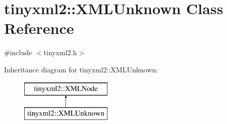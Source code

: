 \hypertarget{classtinyxml2_1_1_x_m_l_unknown}{\section{tinyxml2\-:\-:X\-M\-L\-Unknown Class Reference}
\label{classtinyxml2_1_1_x_m_l_unknown}
}


{\ttfamily \#include $<$tinyxml2.\-h$>$}

Inheritance diagram for tinyxml2\-:\-:X\-M\-L\-Unknown\-:\begin{figure}[H]
\begin{center}
\leavevmode
\includegraphics[height=2.000000cm]{classtinyxml2_1_1_x_m_l_unknown}
\end{center}
\end{figure}
